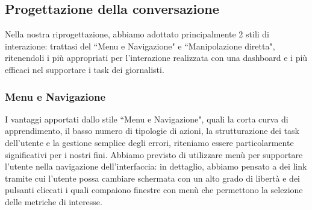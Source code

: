 \subsection{Progettazione della conversazione}
\label{ss:progettazione-conversazione}
Nella nostra riprogettazione, abbiamo adottato principalmente 2 stili di interazione: trattasi del ``Menu e Navigazione" e ``Manipolazione diretta", ritenendoli i più appropriati per l'interazione realizzata con una dashboard e i più efficaci nel supportare i task dei giornalisti.

\subsubsection{Menu e Navigazione}
\label{sss:menu-navigazione}
I vantaggi apportati dallo stile ``Menu e Navigazione", quali la corta curva di apprendimento, il basso numero di tipologie di azioni, la strutturazione dei task dell'utente e la gestione semplice degli errori, riteniamo essere particolarmente significativi per i nostri fini.
Abbiamo previsto di utilizzare menù per supportare l'utente nella navigazione dell'interfaccia: in dettaglio, abbiamo pensato a dei link tramite cui l'utente possa cambiare schermata con un alto grado di libertà e dei pulsanti cliccati i quali compaiono finestre con menù che permettono la selezione delle metriche di interesse. 

